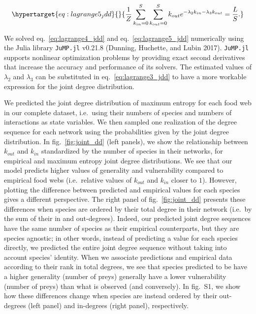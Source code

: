 \documentclass[11pt]{article}
\begin{document}
\begin{equation}\protect\hypertarget{eq:lagrange5_jdd}{}{\frac{1}{Z}\sum_{k_{in}=0}^S\sum_{k_{out}=0}^S k_{out} e^{-\lambda_2k_{in}-\lambda_3k_{out}}  = \frac{L}{S}.}\label{eq:lagrange5_jdd}\end{equation}

We solved eq.~\ref{eq:lagrange4_jdd} and eq.~\ref{eq:lagrange5_jdd}
numerically using the Julia library \texttt{JuMP.jl} v0.21.8 (Dunning,
Huchette, and Lubin 2017). \texttt{JuMP.jl} supports nonlinear
optimization problems by providing exact second derivatives that
increase the accuracy and performance of its solvers. The estimated
values of \(\lambda_2\) and \(\lambda_3\) can be substituted in
eq.~\ref{eq:lagrange3_jdd} to have a more workable expression for the
joint degree distribution.

We predicted the joint degree distribution of maximum entropy for each
food web in our complete dataset, i.e.~using their numbers of species
and numbers of interactions as state variables. We then sampled one
realization of the degree sequence for each network using the
probabilities given by the joint degree distribution. In
fig.~\ref{fig:joint_dd} (left panels), we show the relationship between
\(k_{out}\) and \(k_{in}\) standardized by the number of species in
their networks, for empirical and maximum entropy joint degree
distributions. We see that our model predicts higher values of
generality and vulnerability compared to empirical food webs
(i.e.~relative values of \(k_{out}\) and \(k_{in}\) closer to \(1\)).
However, plotting the difference between predicted and empirical values
for each species gives a different perspective. The right panel of
fig.~\ref{fig:joint_dd} presents these differences when species are
ordered by their total degree in their network (i.e.~by the sum of their
in and out-degrees). Indeed, our predicted joint degree sequences have
the same number of species as their empirical counterparts, but they are
species agnostic; in other words, instead of predicting a value for each
species directly, we predicted the entire joint degree sequence without
taking into account species' identity. When we associate predictions and
empirical data according to their rank in total degrees, we see that
species predicted to be have a higher generality (number of preys)
generally have a lower vulnerability (number of preys) than what is
observed (and conversely). In fig.~S1, we show how these differences
change when species are instead ordered by their out-degrees (left
panel) and in-degrees (right panel), respectively.
\end{document}
